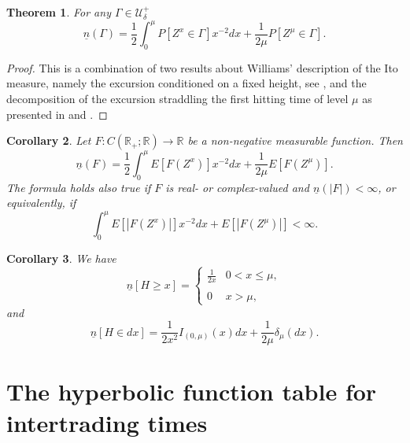 \documentclass[11pt]{scrartcl}
\newtheorem{theorem}{Theorem}
\newtheorem{corollary}[theorem]{Corollary}
\begin{document}
\begin{theorem}
\label{ThmWilT} For any $\Gamma\in\mathcal{U}_\delta^+$ 
\begin{equation}
\underline{n}(\Gamma)=\frac12\int_0^\mu
P[Z^x\in\Gamma]x^{-2}dx+\frac1{2\mu}P[Z^\mu\in\Gamma].
\end{equation}
\end{theorem}

\begin{proof}
This is a combination of two results about Williams' description of the Ito measure,
namely the excursion conditioned on a fixed height, see \cite[Thm.XII.4.5, p.499]{RY},
and the decomposition of the excursion straddling
the first hitting time of level $\mu$ as presented in  \cite[Prop.3.3, p.237]{Rog} and \cite[6.8~(a), p.75]{YY}.
\end{proof}

\begin{corollary}
\label{CorWilT} Let $F:C(\mathbb{R}_+;\mathbb{R})\to\mathbb{R}$ be a
non-negative measurable function. Then 
\begin{equation}
\underline{n}(F)=\frac12\int_0^\mu E[F(Z^x)]x^{-2}dx+\frac1{2\mu}E[F(Z^\mu)].
\end{equation}
The formula holds also true if $F$ is real- or complex-valued and $\underline{n}(|F|)<\infty$, or equivalently, if 
\begin{equation}
\int_0^\mu E[|F(Z^x)|]x^{-2}dx+E[|F(Z^\mu)|]<\infty.
\end{equation}
\end{corollary}

\begin{corollary}
We have 
\begin{equation}
\underline{n}[H\geq x]= \left\{ 
\begin{array}{ll}
\displaystyle\frac1{2x} & 0<x\leq\mu, \\ 
&  \\ 
\displaystyle0 & x>\mu,
\end{array}
\right.
\end{equation}
and 
\begin{equation}
\underline{n}[H\in
dx]=\frac1{2x^2}I_{(0,\mu)}(x)dx+\frac1{2\mu}\delta_\mu(dx).
\end{equation}
\end{corollary}

\section{The hyperbolic function table for intertrading times}
\end{document}
